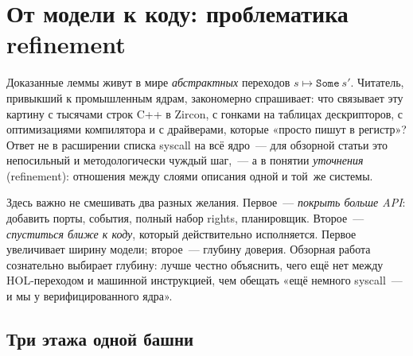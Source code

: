 \documentclass[11pt,a4paper]{article}
\begin{document}
\section{От модели к коду: проблематика refinement}

Доказанные леммы живут в мире \emph{абстрактных} переходов
$s\mapsto\texttt{Some}~s'$. Читатель, привыкший к промышленным ядрам,
закономерно спрашивает: что связывает эту картину с тысячами строк C++ в
Zircon, с гонками на таблицах дескрипторов, с оптимизациями компилятора и
с драйверами, которые «просто пишут в регистр»? Ответ не в расширении
списка syscall на всё ядро~--- для обзорной статьи это непосильный и
методологически чуждый шаг,~--- а в понятии \emph{уточнения}
(refinement): отношения между слоями описания одной и той~же системы.

Здесь важно не смешивать два разных желания. Первое~--- \emph{покрыть
	больше API}: добавить порты, события, полный набор rights, планировщик.
Второе~--- \emph{спуститься ближе к коду}, который действительно
исполняется. Первое увеличивает ширину модели; второе~--- глубину доверия.
Обзорная работа сознательно выбирает глубину: лучше честно объяснить, чего
ещё нет между HOL-переходом и машинной инструкцией, чем обещать «ещё
немного syscall~--- и мы у верифицированного ядра».

\subsection{Три этажа одной башни}
\end{document}
